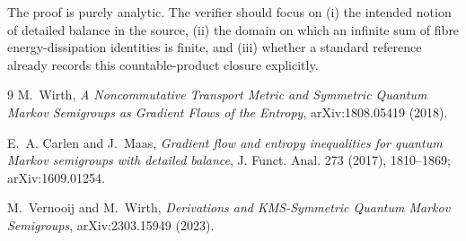 \documentclass[11pt]{article}
\begin{document}
The proof is purely analytic.  The verifier should focus on (i) the intended
notion of detailed balance in the source, (ii) the domain on which an infinite
sum of fibre energy-dissipation identities is finite, and (iii) whether a
standard reference already records this countable-product closure explicitly.

\begin{thebibliography}{9}
M.~Wirth,
\emph{A Noncommutative Transport Metric and Symmetric Quantum Markov
Semigroups as Gradient Flows of the Entropy}, arXiv:1808.05419 (2018).

E.~A. Carlen and J.~Maas,
\emph{Gradient flow and entropy inequalities for quantum Markov semigroups
with detailed balance}, J. Funct. Anal. 273 (2017), 1810--1869;
arXiv:1609.01254.

M.~Vernooij and M.~Wirth,
\emph{Derivations and KMS-Symmetric Quantum Markov Semigroups},
arXiv:2303.15949 (2023).
\end{thebibliography}
\end{document}
